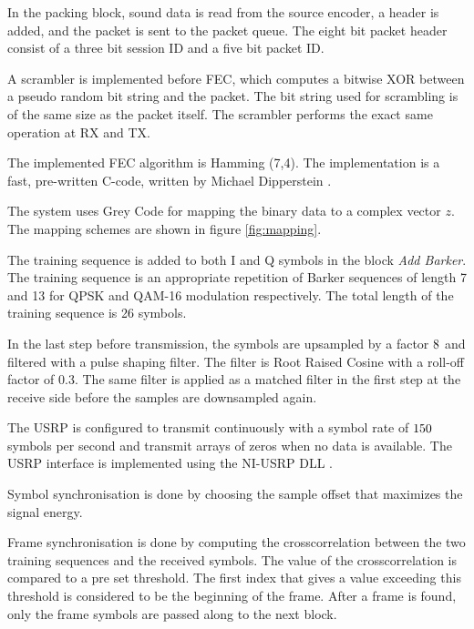 In the packing block, sound data is read from the source encoder, a header is added, and the packet is sent to the packet queue. The eight bit packet header consist of a three bit session ID and a five bit packet ID. 

A scrambler is implemented before FEC, which computes a bitwise XOR between a pseudo random bit string and the packet. The bit string used for scrambling is of the same size as the packet itself. The scrambler performs the exact same operation at RX and TX.

The implemented FEC algorithm is Hamming (7,4). The implementation is a fast, pre-written C-code, written by Michael Dipperstein \cite{hamming}. 

The system uses Grey Code for mapping the binary data to a complex vector $z$. The mapping schemes are shown in figure \ref{fig:mapping}.



The training sequence is added to both I and Q symbols in the block \textit{Add Barker}. The training sequence is an appropriate repetition of Barker sequences of length 7 and 13 for QPSK and QAM-16 modulation respectively. The total length of the training sequence is 26 symbols. 

In the last step before transmission, the symbols are upsampled by a factor $8$ and filtered with a pulse shaping filter. The filter is Root Raised Cosine with a roll-off factor of 0.3. The same filter is applied as a matched filter in the first step at the receive side before the samples are downsampled again. 

The USRP is configured to transmit continuously with a symbol rate of $150$ symbols per second and transmit arrays of zeros when no data is available. The USRP interface is implemented using the NI-USRP DLL \cite{labviewDLL}.

Symbol synchronisation is done by choosing the sample offset that maximizes the signal energy. 

Frame synchronisation is done by computing the crosscorrelation between the two training sequences and the received symbols. The value of the crosscorrelation is compared to a pre set threshold. The first index that gives a value exceeding this threshold is considered to be the beginning of the frame. After a frame is found, only the frame symbols are passed along to the next block.

